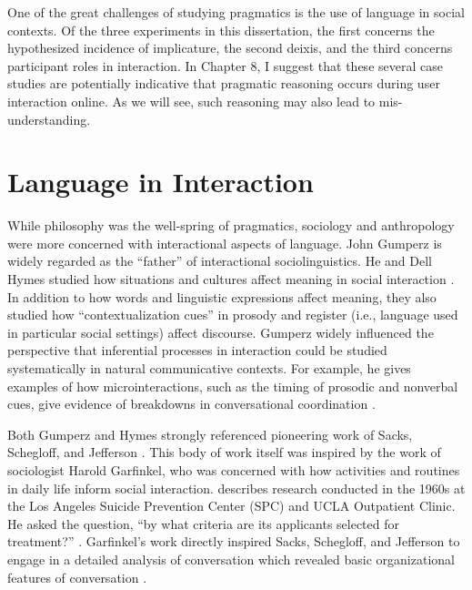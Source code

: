 One of the great challenges of studying pragmatics is the use of language in social contexts. Of the three experiments in this dissertation, the first concerns the hypothesized incidence of implicature, the second deixis, and the third concerns participant roles in interaction. In Chapter 8, I suggest that these several case studies are potentially indicative that pragmatic reasoning occurs during user interaction online. As we will see, such reasoning may also lead to mis-understanding.
 

\section{Language in Interaction}
\label{languageininteraction}

While philosophy was the well-spring of pragmatics, sociology and anthropology were more concerned with interactional aspects of language. John Gumperz is widely regarded as the ``father'' of interactional sociolinguistics. He and Dell Hymes studied how situations and cultures affect meaning in social interaction  \citep{Gumperz:1982tc,Hymes:1974wr}.  In addition to how words and linguistic expressions affect meaning, they also studied how ``contextualization cues'' in prosody and register (i.e., language used in particular social settings) affect discourse. Gumperz widely influenced the perspective that inferential processes in interaction could be studied systematically in natural communicative contexts. For example, he gives examples of how microinteractions, such as the timing of prosodic and nonverbal cues, give evidence of breakdowns in conversational coordination  \citep{Gumperz:1982tc}. 

Both Gumperz and Hymes strongly referenced pioneering work of Sacks, Schegloff, and Jefferson  \citep{Schegloff:1973tg,Sacks:1974uy,Schegloff:1977tc,Jefferson:1972ta}.  This body of work itself was inspired by the work of sociologist Harold Garfinkel, who was concerned with how activities and routines in daily life inform social interaction.  \cite{Garfinkel:1967vn}  describes research conducted in the 1960s at the Los Angeles Suicide Prevention Center (SPC) and UCLA Outpatient Clinic. He asked the question, ``by what criteria are its applicants selected for treatment?''  \citep[p. 18]{Garfinkel:1967vn}.  Garfinkel's work directly inspired Sacks, Schegloff, and Jefferson to engage in a detailed analysis of conversation which revealed basic organizational features of conversation  \citep{Sacks:1974uy}.  


